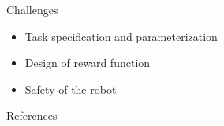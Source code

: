 \documentclass[10pt]{beamer}
\begin{document}
\begin{frame}{Challenges}
	\begin{itemize}	
		\item Task specification and parameterization
		\item Design of reward function
		\item Safety of the robot
	\end{itemize}
\end{frame}

\begin{frame}[allowframebreaks]{References}

  
  

\end{frame}
\end{document}
